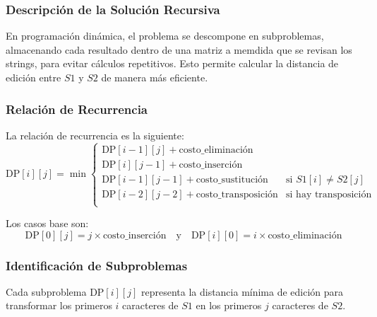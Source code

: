 \subsubsection{Descripción de la Solución Recursiva}
En programación dinámica, el problema se descompone en subproblemas, almacenando cada resultado dentro de una matriz a memdida que se revisan los strings, para evitar cálculos repetitivos. Esto permite calcular la distancia de edición entre \( S1 \) y \( S2 \) de manera más eficiente.


\subsubsection{Relación de Recurrencia}
La relación de recurrencia es la siguiente:
\[
\text{DP}[i][j] = \min \begin{cases} 
    \text{DP}[i-1][j] + \text{costo\_eliminación} \\
    \text{DP}[i][j-1] + \text{costo\_inserción} \\
    \text{DP}[i-1][j-1] + \text{costo\_sustitución} & \text{si } S1[i] \neq S2[j] \\
    \text{DP}[i-2][j-2] + \text{costo\_transposición} & \text{si hay transposición} \\
\end{cases}
\]

Los casos base son:
\[
\text{DP}[0][j] = j \times \text{costo\_inserción} \quad \text{y} \quad \text{DP}[i][0] = i \times \text{costo\_eliminación}
\]

\subsubsection{Identificación de Subproblemas}
Cada subproblema \( \text{DP}[i][j] \) representa la distancia mínima de edición para transformar los primeros \( i \) caracteres de \( S1 \) en los primeros \( j \) caracteres de \( S2 \).



